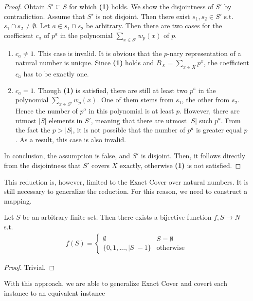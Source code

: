 \begin{proof}
    \label{lemma:sscompl}
    Obtain $S' \subseteq S$ for which \textbf{(1)} holds. We show the disjointness of $S'$ by contradiction. 
Assume that $S'$ is not disjoint. Then there exist $s_1, s_2 \in S'$ s.t. $s_1 \cap s_2 \not= \emptyset$. Let $a \in s_1 \cap s_2$ be arbitrary. Then 
there are two cases for the coefficient $c_a$ of $p^a$ in the polynomial $\sum_{x \in S'} w_p(x)$ of $p$. 
\begin{enumerate}
    \item $c_a \neq 1$. This case is invalid. It is obvious that the $p$-nary representation of 
    a natural number is unique. Since \textbf{(1)} holds and $B_X = \sum_{x \in X} {p^x}$, the coefficient 
    $c_a$ has to be exactly one.
    \item $c_a = 1$. Though \textbf{(1)} is satisfied, there are still at least two $p^a$ in the polynomial $\sum_{x \in S'} w_p(x)$.
    One of them stems from $s_1$, the other from $s_2$.
    Hence the number of $p^a$ in this polynomial is at least $p$. However, there are utmost $|S|$ elements in $S'$, meaning that there are utmost $|S|$ such $p^a$. From the 
    fact the $p > |S|$, it is not possible that the number of $p^a$ is greater equal $p$. As a result, this case is also invalid.
\end{enumerate}
In conclusion, the assumption is false, and $S'$ is disjoint. Then, it follows directly from the disjointness that $S'$ covers $X$ exactly, otherwise \textbf{(1)}
is not satisfied.
\end{proof}
This reduction is, however, limited to the Exact Cover over natural numbers. It is still necessary to generalize the reduction. 
For this reason, we need to construct a mapping.
\begin{lemma}
    Let $S$ be an arbitrary finite set. Then there exists a bijective function $f, S \rightarrow N$ s.t. 
    \begin{align*}
        f(S) = \begin{cases}
            \emptyset & S = \emptyset \\ 
            \{0, 1, ..., |S| - 1\} & \text{otherwise}
        \end{cases}
    \end{align*}
\end{lemma}
\begin{proof}
    Trivial.
\end{proof}
With this approach, we are able to generalize Exact Cover and covert each instance to an equivalent instance 
